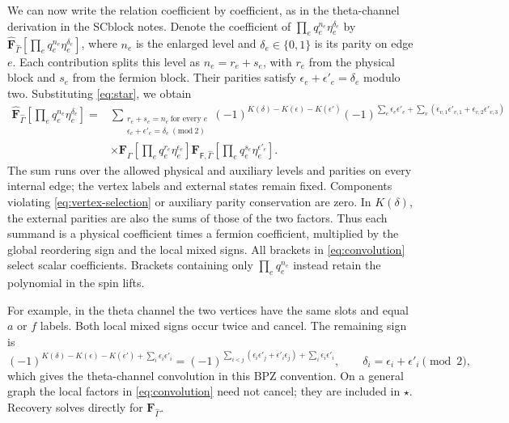 \documentclass[11pt]{article}
\newcommand{\F}{\mathsf F}
\numberwithin{equation}{section}
\begin{document}
We can now write the relation coefficient by coefficient, as in the
theta-channel derivation in the SCblock notes. Denote the coefficient of
$\prod_e q_e^{n_e}\eta_e^{\delta_e}$ by
$\widehat{\mathbf F}_{\hat\Gamma}
[\prod_e q_e^{n_e}\eta_e^{\delta_e}]$, where $n_e$ is the enlarged
level and $\delta_e\in\{0,1\}$ is its parity on edge $e$.
Each contribution splits this level as $n_e=r_e+s_e$, with $r_e$ from
the physical block and $s_e$ from the fermion block. Their parities
satisfy $\epsilon_e+\epsilon'_e=\delta_e$ modulo two. Substituting
\eqref{eq:star}, we obtain
\begin{align}
 \widehat{\mathbf F}_{\hat\Gamma}
 \left[\prod_e q_e^{n_e}\eta_e^{\delta_e}\right]
 ={}&\sum_{\substack{r_e+s_e=n_e\ \text{for every }e\\
              \epsilon_e+\epsilon'_e=\delta_e\ (\mathrm{mod}\ 2)}}
 (-1)^{K(\delta)-K(\epsilon)-K(\epsilon')}
 (-1)^{\sum_e\epsilon_e\epsilon'_e
       +\sum_v(\epsilon_{v,1}\epsilon'_{v,1}
                    +\epsilon_{v,2}\epsilon'_{v,3})}
 \nonumber\\
 &\times\mathbf F_{\hat\Gamma}
       \left[\prod_e q_e^{r_e}\eta_e^{\epsilon_e}\right]
 \mathbf F_{\F,\hat\Gamma}
       \left[\prod_e q_e^{s_e}\eta_e^{\epsilon'_e}\right].
 \label{eq:convolution}
\end{align}
The sum runs over the allowed physical and auxiliary levels and parities
on every internal edge; the vertex labels and external states remain
fixed. Components violating \eqref{eq:vertex-selection} or auxiliary
parity conservation are zero. In $K(\delta)$, the external parities are
also the sums of those of the two factors. Thus each summand is a
physical coefficient times a fermion coefficient, multiplied by the
global reordering sign and the local mixed signs. All brackets in \eqref{eq:convolution} select scalar
coefficients. Brackets containing only $\prod_e q_e^{n_e}$ instead retain
the polynomial in the spin lifts.

For example, in the theta channel the two vertices have the same slots
and equal $a$ or $f$ labels. Both local mixed signs occur twice and
cancel. The remaining sign is
\[
 (-1)^{K(\delta)-K(\epsilon)-K(\epsilon')
         +\sum_i\epsilon_i\epsilon'_i}
 =(-1)^{\sum_{i<j}(\epsilon_i\epsilon'_j+
                 \epsilon'_i\epsilon_j)
                    +\sum_i\epsilon_i\epsilon'_i},
 \qquad \delta_i=\epsilon_i+\epsilon'_i\pmod2,
\]
which gives the theta-channel convolution in this BPZ convention.
On a general graph the local factors in \eqref{eq:convolution} need not
cancel; they are included in $\star$. Recovery solves directly for
$\mathbf F_{\hat\Gamma}$.
\end{document}

